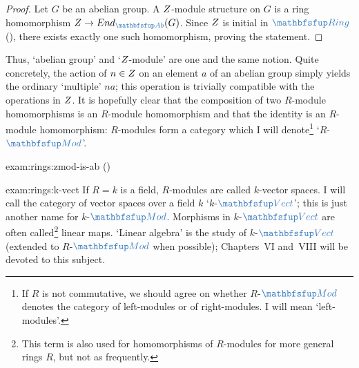 \begin{proof}
  Let $G$ be an abelian group. A $Z$-module structure on $G$ is a
  ring homomorphism $\Z \to \End_{\categ{Ab}}(G)$. Since $Z$ is
  initial in $\categ{Ring}$
  (), there exists exactly
  one such homomorphism, proving the statement.
\end{proof}
Thus, `abelian group' and `$Z$-module' are one and the same
notion. Quite concretely, the action of $n \in Z$ on an element $a$
of an abelian group simply yields the ordinary `multiple' $na$; this
operation is trivially compatible with the operations in $Z$.  
It is hopefully clear that the composition of two $R$-module
homomorphisms is an $R$-module homomorphism and that the identity is
an $R$-module homomorphism: $R$-modules form a category which I will
denote\footnote{If $R$ is not commutative, we should agree on whether
  $R$-$\categ{Mod}$ denotes the category of left-modules or of
  right-modules. I will mean `left-modules'.} `$R$-$\categ{Mod}$'.
\begin{exam}{}{exam:rings:zmod-is-ab}
  ()
\end{exam}
\begin{exam}{}{exam:rings:k-vect}
  If $R = k$ is a field, $R$-modules are called $k$-vector spaces. I
  will call the category of vector spaces over a field $k$
  `$k$-$\categ{Vect}$'; this is just another name for
  $k$-$\categ{Mod}$. Morphisms in $k$-$\categ{Vect}$ are often
  called\footnote{This term is also used for homomorphisms of
    $R$-modules for more general rings $R$, but not as frequently.}
  linear maps. `Linear algebra' is the study of $k$-$\categ{Vect}$
  (extended to $R$-$\categ{Mod}$ when possible); Chapters~VI and~VIII
  will be devoted to this subject.
\end{exam}
